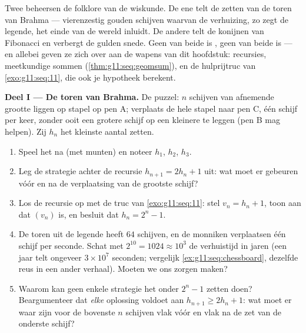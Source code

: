 \begin{problem}
\label{pb:g11:seq:1}
Twee  beheersen de folklore van de wiskunde. De ene telt de zetten van
de toren van Brahma --- vierenzestig gouden schijven waarvan de verhuizing,
zo zegt de legende, het einde van de wereld inluidt. De andere telt de
konijnen van Fibonacci en verbergt de gulden snede. Geen van beide is
, geen van beide is  --- en allebei geven ze zich over
aan de wapens van dit hoofdstuk: recursies, meetkundige sommen
(\cref{thm:g11:seq:geomsum}), en de hulprijtruc van \cref{exo:g11:seq:11},
die ook je hypotheek berekent.

\medskip
\noindent\textbf{Deel I --- De toren van Brahma.}
De puzzel: $n$ schijven van afnemende grootte liggen op stapel op pen A;
verplaats de hele stapel naar pen C, één schijf per keer, zonder ooit een
grotere schijf op een kleinere te leggen (pen B mag helpen). Zij $h_n$ het
kleinste aantal zetten.
\begin{enumerate}
  \item Speel het na (met munten) en noteer $h_1$, $h_2$, $h_3$.
  \item Leg de strategie achter de recursie $h_{n+1} = 2h_n + 1$ uit: wat moet
        er gebeuren vóór en na de verplaatsing van de grootste schijf?
  \item Los de recursie op met de truc van \cref{exo:g11:seq:11}: stel
        $v_n = h_n + 1$, toon aan dat $(v_n)$  is, en besluit dat
        $h_n = 2^n - 1$.
  \item De toren uit de legende heeft $64$ schijven, en de monniken
        verplaatsen één schijf per seconde. Schat met $2^{10} = 1024 \approx
        10^3$ de verhuistijd in jaren (een jaar telt ongeveer
        $3 \times 10^7$ seconden; vergelijk \cref{ex:g11:seq:chessboard},
        dezelfde reus in een ander verhaal). Moeten we ons zorgen maken?
  \item Waarom kan geen enkele strategie het onder $2^n - 1$ zetten doen?
        Beargumenteer dat \emph{elke} oplossing voldoet aan
        $h_{n+1} \geq 2 h_n + 1$: wat moet er waar zijn voor de bovenste $n$
        schijven vlak vóór en vlak na de zet van de onderste schijf?
\end{enumerate}


\end{problem}
